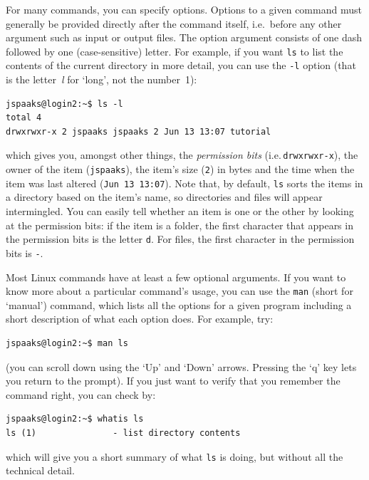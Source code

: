 For many commands, you can specify options. Options to a given command must generally be provided directly after the command itself, i.e.~before any other argument such as input or output files.  The option argument consists of one dash followed by one (case-sensitive) letter. For example, if you want \texttt{ls} to list the contents of the current directory in more detail, you can use the \texttt{-l} option (that is the letter~\textit{l} for `long', not the number~1):
\begin{lstlisting}[style=basic,style=bash]
jspaaks@login2:~$ ls -l
total 4
drwxrwxr-x 2 jspaaks jspaaks 2 Jun 13 13:07 tutorial
\end{lstlisting}
which gives you, amongst other things, the \textit{permission bits} (i.e.\,\lstinline{drwxrwxr-x}), the owner of the item (\lstinline{jspaaks}), the item's size (\lstinline{2}) in bytes and the time when the item was last altered (\lstinline{Jun 13 13:07}). Note that, by default, \lstinline[style=bashinline]{ls} sorts the items in a directory based on the item's name, so directories and files will appear intermingled. You can easily tell whether an item is one or the other by looking at the permission bits: if the item is a folder, the first character that appears in the permission bits is the letter \lstinline[style=bashinline]{d}. For files, the first character in the permission bits is \lstinline[style=bashinline]{-}.

Most Linux commands have at least a few optional arguments. If you want to know more about a particular command's usage, you can use the \texttt{man} (short for `manual') command, which lists all the options for a given program including a short description of what each option does. For example, try:
\begin{lstlisting}[style=basic,style=bash]
jspaaks@login2:~$ man ls
\end{lstlisting}
(you can scroll down using the `Up' and `Down' arrows. Pressing the `q' key lets you return to the prompt). If you just want to verify that you remember the command right, you can check by:
\begin{lstlisting}[style=basic,style=bash]
jspaaks@login2:~$ whatis ls
ls (1)               - list directory contents
\end{lstlisting}
which will give you a short summary of what \lstinline{ls} is doing, but without all the technical detail.


